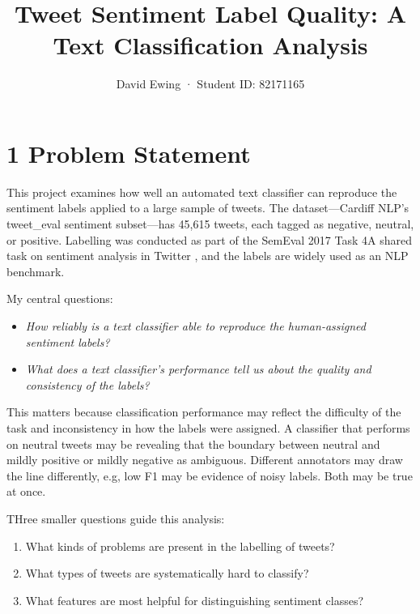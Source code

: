 \documentclass[12pt]{article}
\title{Tweet Sentiment Label Quality: A Text Classification Analysis}
\author{David Ewing · Student ID: 82171165}
\date{}
\begin{document}
\maketitle

\section*{1 Problem Statement}



This project examines how well an automated text classifier can reproduce the sentiment labels applied to a large sample of tweets. The dataset---Cardiff NLP's tweet\_eval sentiment subset---has 45,615 tweets, each tagged as negative, neutral, or positive. Labelling was conducted as part of the SemEval 2017 Task 4A shared task on sentiment analysis in Twitter \citep{rosenthal2017semeval}, and the labels are widely used as an NLP benchmark.

My central questions: 

\begin{itemize}
  \item \textit{How reliably is a text classifier able to reproduce the human-assigned sentiment labels?}
  \item \textit{What does a text classifier's performance tell us about the quality and consistency of the labels?}
\end{itemize}

This matters because  classification performance may reflect  the difficulty of the task and inconsistency in how the labels were assigned. 
A classifier that performs  on neutral tweets may be revealing that the boundary 
between neutral and mildly positive or mildly negative as ambiguous.
Different annotators may draw the line differently,
 e.g, low F1 may be evidence of noisy labels. Both may be true at once.

THree smaller questions guide this analysis:

\begin{enumerate}

  \item What kinds of problems are present in the labelling of tweets?

  \item What types of tweets are systematically hard to classify?

  \item What features are most helpful for distinguishing sentiment classes?

  
\end{enumerate}
\end{document}
